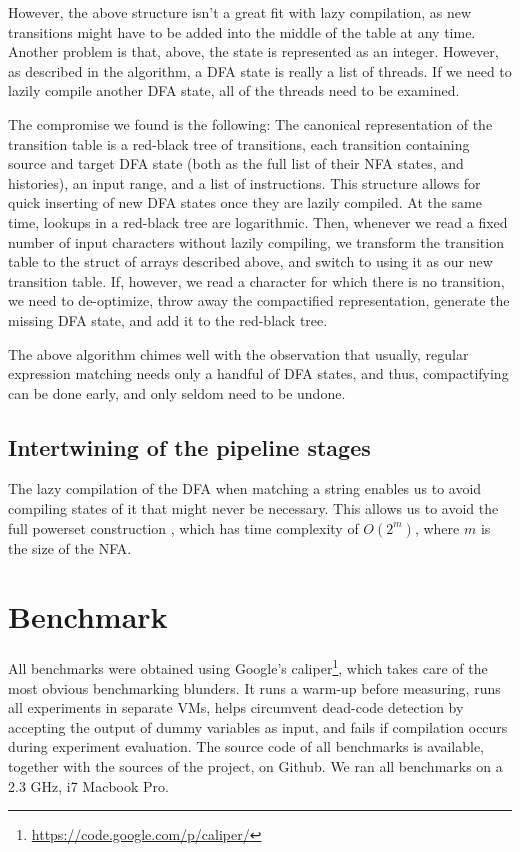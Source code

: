 \documentclass[english]{sigplanconf}
\theoremstyle{definition}
\begin{document}
However, the above structure isn't a great fit with lazy compilation,
as new transitions might have to be added into the middle of the
table at any time.  Another problem is that, above, the state is
represented as an integer.  However, as described in the algorithm,
a DFA state is really a list of threads. If we need to lazily compile
another DFA state, all of the threads need to be examined.

The compromise we found is the following: The canonical representation
of the transition table is a red-black tree of transitions, each
transition containing source and target DFA state (both as the full
list of their NFA states, and histories), an input range, and a
list of instructions. This structure allows for quick inserting of
new DFA states once they are lazily compiled.  At the same time,
lookups in a red-black tree are logarithmic.  Then, whenever we
read a fixed number of input characters without lazily compiling,
we transform the transition table to the struct of arrays described
above, and switch to using it as our new transition table.
If, however, we read a character for which there is no transition, we need to
de-optimize, throw away the compactified representation, 
generate the missing DFA state, and add it to the red-black tree.

The above algorithm chimes well with the observation that usually,
regular expression matching needs only a handful of DFA states, and thus,
compactifying can be done early, and only seldom need to be undone.

\subsection{Intertwining of the pipeline stages}
The lazy compilation of the DFA when matching a string enables us
to avoid compiling states of it that might never be necessary. This
allows us to avoid the full powerset construction \cite{Sips05a}, which has 
time complexity of $O(2^m)$, where $m$ is the size of the NFA.

\section{Benchmark}
All benchmarks were obtained using Google's
caliper\footnote{\url{https://code.google.com/p/caliper/}}, which
takes care of the most obvious benchmarking blunders.  It runs a
warm-up before measuring, runs all experiments in separate VMs,
helps circumvent dead-code detection by accepting the output of
dummy variables as input, and fails if compilation occurs during
experiment evaluation.  The source code of all benchmarks is
available, together with the sources of the project, on Github. We
ran all benchmarks on a 2.3 GHz, i7 Macbook Pro.
\end{document}
